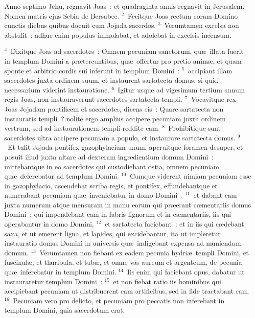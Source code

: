 \lettrine[lines=10,image=true,loversize=0.05,lraise=-0.03]{A}{}nno septimo Jehu, regnavit Joas~: et quadraginta annis regnavit in Jerusalem. Nomen matris ejus Sebia de Bersabee.
${}^{2}$~Fecitque Joas rectum coram Domino cunctis diebus quibus docuit eum Jojada sacerdos.
${}^{3}$~Verumtamen excelsa non abstulit~: adhuc enim populus immolabat, et adolebat in excelsis incensum.


${}^{4}$~Dixitque Joas ad sacerdotes~: Omnem pecuniam sanctorum, qu\ae\ illata fuerit in templum Domini a pr\ae tereuntibus, qu\ae\ offertur pro pretio anim\ae , et quam sponte et arbitrio cordis sui inferunt in templum Domini~:
${}^{5}$~accipiant illam sacerdotes juxta ordinem suum, et instaurent sartatecta domus, si quid necessarium viderint instauratione.
${}^{6}$~Igitur usque ad vigesimum tertium annum regis Joas, non instauraverunt sacerdotes sartatecta templi.
${}^{7}$~Vocavitque rex Joas Jojadam pontificem et sacerdotes, dicens eis~: Quare sartatecta non instauratis templi~? nolite ergo amplius accipere pecuniam juxta ordinem vestrum, sed ad instaurationem templi reddite eam.
${}^{8}$~Prohibitique sunt sacerdotes ultra accipere pecuniam a populo, et instaurare sartatecta domus.
${}^{9}$~Et tulit Jojada pontifex gazophylacium unum, aperuitque foramen desuper, et posuit illud juxta altare ad dexteram ingredientium domum Domini~: mittebantque in eo sacerdotes qui custodiebant ostia, omnem pecuniam qu\ae\ deferebatur ad templum Domini.
${}^{10}$~Cumque viderent nimiam pecuniam esse in gazophylacio, ascendebat scriba regis, et pontifex, effundebantque et numerabant pecuniam qu\ae\ inveniebatur in domo Domini~:
${}^{11}$~et dabant eam juxta numerum atque mensuram in manu eorum qui pr\ae erant c\ae mentariis domus Domini~: qui impendebant eam in fabris lignorum et in c\ae mentariis, iis qui operabantur in domo Domini,
${}^{12}$~et sartatecta faciebant~: et in iis qui c\ae debant saxa, et ut emerent ligna, et lapides, qui excidebantur, ita ut impleretur instauratio domus Domini in universis qu\ae\ indigebant expensa ad muniendam domum.
${}^{13}$~Verumtamen non fiebant ex eadem pecunia hydri\ae\ templi Domini, et fuscinul\ae , et thuribula, et tub\ae , et omne vas aureum et argenteum, de pecunia qu\ae\ inferebatur in templum Domini.
${}^{14}$~Iis enim qui faciebant opus, dabatur ut instauraretur templum Domini~:
${}^{15}$~et non fiebat ratio iis hominibus qui accipiebant pecuniam ut distribuerent eam artificibus, sed in fide tractabant eam.
${}^{16}$~Pecuniam vero pro delicto, et pecuniam pro peccatis non inferebant in templum Domini, quia sacerdotum erat.


